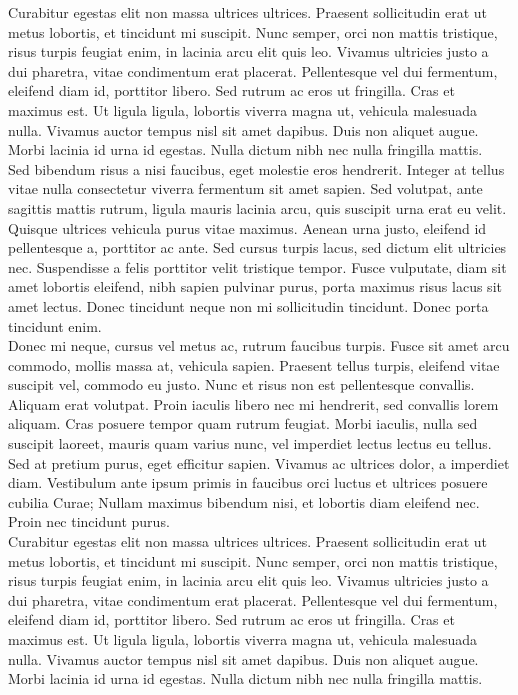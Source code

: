 Curabitur egestas elit non massa ultrices ultrices. Praesent sollicitudin erat ut metus lobortis, et tincidunt mi suscipit. Nunc semper, orci non mattis tristique, risus turpis feugiat enim, in lacinia arcu elit quis leo. Vivamus ultricies justo a dui pharetra, vitae condimentum erat placerat. Pellentesque vel dui fermentum, eleifend diam id, porttitor libero. Sed rutrum ac eros ut fringilla. Cras et maximus est. Ut ligula ligula, lobortis viverra magna ut, vehicula malesuada nulla. Vivamus auctor tempus nisl sit amet dapibus. Duis non aliquet augue. Morbi lacinia id urna id egestas. Nulla dictum nibh nec nulla fringilla mattis.
\\

Sed bibendum risus a nisi faucibus, eget molestie eros hendrerit. Integer at tellus vitae nulla consectetur viverra fermentum sit amet sapien. Sed volutpat, ante sagittis mattis rutrum, ligula mauris lacinia arcu, quis suscipit urna erat eu velit. Quisque ultrices vehicula purus vitae maximus. Aenean urna justo, eleifend id pellentesque a, porttitor ac ante. Sed cursus turpis lacus, sed dictum elit ultricies nec. Suspendisse a felis porttitor velit tristique tempor. Fusce vulputate, diam sit amet lobortis eleifend, nibh sapien pulvinar purus, porta maximus risus lacus sit amet lectus. Donec tincidunt neque non mi sollicitudin tincidunt. Donec porta tincidunt enim.
\\

Donec mi neque, cursus vel metus ac, rutrum faucibus turpis. Fusce sit amet arcu commodo, mollis massa at, vehicula sapien. Praesent tellus turpis, eleifend vitae suscipit vel, commodo eu justo. Nunc et risus non est pellentesque convallis. Aliquam erat volutpat. Proin iaculis libero nec mi hendrerit, sed convallis lorem aliquam. Cras posuere tempor quam rutrum feugiat. Morbi iaculis, nulla sed suscipit laoreet, mauris quam varius nunc, vel imperdiet lectus lectus eu tellus. Sed at pretium purus, eget efficitur sapien. Vivamus ac ultrices dolor, a imperdiet diam. Vestibulum ante ipsum primis in faucibus orci luctus et ultrices posuere cubilia Curae; Nullam maximus bibendum nisi, et lobortis diam eleifend nec. Proin nec tincidunt purus. 
\\

Curabitur egestas elit non massa ultrices ultrices. Praesent sollicitudin erat ut metus lobortis, et tincidunt mi suscipit. Nunc semper, orci non mattis tristique, risus turpis feugiat enim, in lacinia arcu elit quis leo. Vivamus ultricies justo a dui pharetra, vitae condimentum erat placerat. Pellentesque vel dui fermentum, eleifend diam id, porttitor libero. Sed rutrum ac eros ut fringilla. Cras et maximus est. Ut ligula ligula, lobortis viverra magna ut, vehicula malesuada nulla. Vivamus auctor tempus nisl sit amet dapibus. Duis non aliquet augue. Morbi lacinia id urna id egestas. Nulla dictum nibh nec nulla fringilla mattis.
\\

